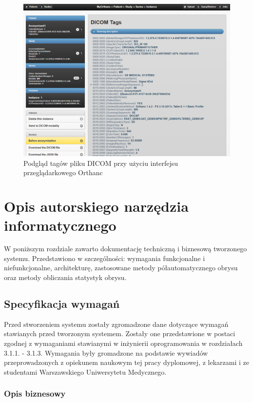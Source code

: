 \documentclass[a4paper,11pt,twoside,openright]{report}
\theoremstyle{definition}
\begin{document}
\begin{figure}[t]
	\center
	\includegraphics[width=1\textwidth]{Orthanc-tags}
	\caption{Podgląd tagów pliku DICOM przy użyciu interfejsu przeglądarkowego Orthanc}
    	\label{fig:Orthanc-tags}
\end{figure}


\chapter {Opis autorskiego narzędzia informatycznego}

W poniższym rozdziale zawarto dokumentację techniczną i biznesową tworzonego systemu.
 Przedstawiono w szczególności: wymagania funkcjonalne i niefunkcjonalne,
 architekturę, zastosowane metody półautomatycznego obrysu oraz metody obliczania
 statystyk obrysu.

\section {Specyfikacja wymagań}

Przed stworzeniem systemu zostały zgromadzone dane dotyczące wymagań stawianych
przed tworzonym systemem. Zostały one przedstawione w postaci zgodnej z wymaganiami
stawianymi w inżynierii oprogramowania w rozdziałach 3.1.1. - 3.1.3. Wymagania
były gromadzone na podstawie wywiadów przeprowadzonych z opiekunem naukowym tej
pracy dyplomowej, z lekarzami i ze studentami Warszawskiego Uniwersytetu Medycznego.

\subsection {Opis biznesowy}
\end{document}
